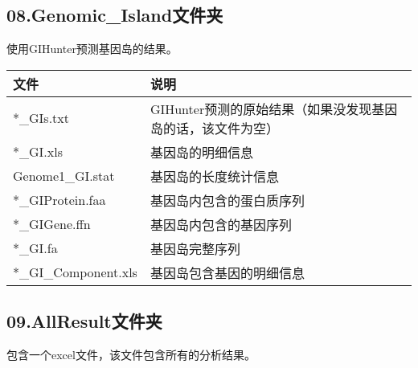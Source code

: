 \subsection{08.Genomic\_Island文件夹}
使用GIHunter预测基因岛的结果。
\begin{table}[H]
        \begin{center}
            \begin{threeparttable}
                \begin{tabularx}{\textwidth}{XX}

                    \toprule
                    \bfseries{文件}                  &\bfseries{说明}\\
                    \midrule
                    *\_GIs.txt		                 &GIHunter预测的原始结果（如果没发现基因岛的话，该文件为空）\\
                    *\_GI.xls		                 &基因岛的明细信息\\
                    Genome1\_GI.stat	              &基因岛的长度统计信息\\
                    *\_GIProtein.faa	              &基因岛内包含的蛋白质序列\\
                    *\_GIGene.ffn		             &基因岛内包含的基因序列\\
                    *\_GI.fa			             &基因岛完整序列\\
                    *\_GI\_Component.xls	          &基因岛包含基因的明细信息\\
                    \bottomrule

                \end{tabularx}

            \end{threeparttable}
        \end{center}
\end{table}

\subsection{09.AllResult文件夹}
包含一个excel文件，该文件包含所有的分析结果。
